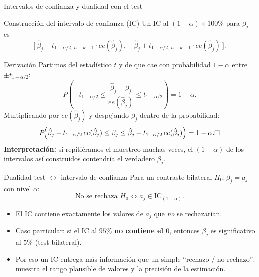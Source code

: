\documentclass{beamer}
\begin{document}
\begin{frame}[allowframebreaks]{Intervalos de confianza y dualidad con el test}

\begin{alertblock}{Construcción del intervalo de confianza (IC)}
Un IC al $(1-\alpha)\times 100\%$ para $\beta_j$ es
\[
\Big[\ \hat{\beta}_j - t_{1-\alpha/2,\,n-k-1}\cdot ee(\hat{\beta}_j),\quad
\hat{\beta}_j + t_{1-\alpha/2,\,n-k-1}\cdot ee(\hat{\beta}_j)\ \Big].
\]
\end{alertblock}

\begin{exampleblock}{Derivación}
Partimos del estadístico $t$ y de que cae con probabilidad $1-\alpha$ entre $\pm t_{1-\alpha/2}$:
\[
P\!\left(-t_{1-\alpha/2} \le \frac{\hat{\beta}_j - \beta_j}{ee(\hat{\beta}_j)} \le t_{1-\alpha/2}\right) = 1-\alpha.
\]
Multiplicando por $ee(\hat{\beta}_j)$ y despejando $\beta_j$ dentro de la probabilidad:
\[
P\!\Big(\hat{\beta}_j - t_{1-\alpha/2}\,ee(\hat{\beta}_j) \le \beta_j \le \hat{\beta}_j + t_{1-\alpha/2}\,ee(\hat{\beta}_j)\Big) = 1-\alpha. \hfill \square
\]
\textbf{Interpretación:} si repitiéramos el muestreo muchas veces, el $(1-\alpha)$ de los intervalos así construidos contendría el verdadero $\beta_j$.
\end{exampleblock}

\framebreak

\begin{block}{Dualidad test $\leftrightarrow$ intervalo de confianza}
Para un contraste bilateral $H_0:\beta_j = a_j$ con nivel $\alpha$:
\[
\text{No se rechaza } H_0 \iff a_j \in \text{IC}_{(1-\alpha)}.
\]
\end{block}
\begin{itemize}
    \item El IC contiene exactamente los valores de $a_j$ que \emph{no} se rechazarían.
    \item Caso particular: si el IC al $95\%$ \textbf{no contiene el $0$}, entonces $\beta_j$ es significativo al $5\%$ (test bilateral).
    \item Por eso un IC entrega más información que un simple ``rechazo / no rechazo'': muestra el rango plausible de valores y la precisión de la estimación.
\end{itemize}
\end{frame}
\end{document}
